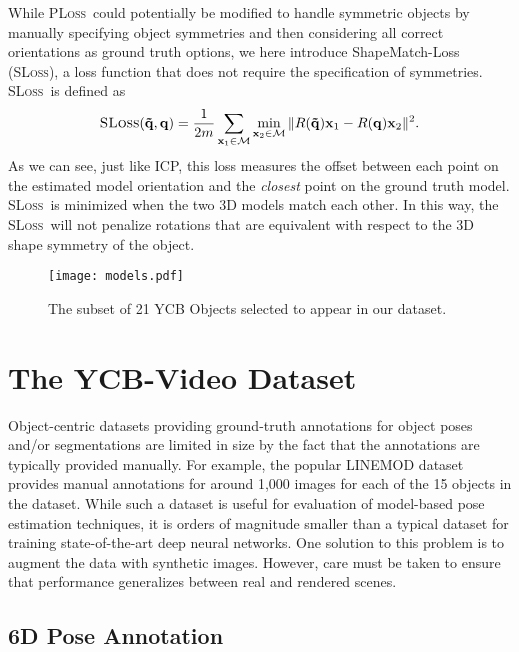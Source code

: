 \documentclass[conference]{IEEEtran}
\newcommand{\sloss}{\textsc{SLoss}}
\newcommand{\pl}{\textsc{PLoss}}
\begin{document}
While \pl\ could potentially be modified to handle symmetric objects by manually specifying object symmetries and then considering all correct orientations as ground truth options, we here introduce ShapeMatch-Loss (\sloss), a loss function that does not require the specification of symmetries. \sloss\ is defined as
\begin{equation}
\text{\sloss}(\mathbf{\tilde{q}}, \mathbf{q}) = \frac{1}{2m}\sum_{\mathbf{x}_1 \in \mathcal{M}} \min_{\mathbf{x}_2 \in \mathcal{M}} \| R(\mathbf{\tilde{q}}) \mathbf{x}_1 - R(\mathbf{q}) \mathbf{x}_2  \|^2.
\end{equation}
As we can see, just like ICP, this loss measures the offset between each point on the estimated model orientation and the \emph{closest} point on the ground truth model. \sloss\ is minimized when the two 3D models match each other. In this way, the \sloss\ will not penalize rotations that are equivalent with respect to the 3D shape symmetry of the object.










\begin{figure}
	\centering
	\texttt{[image: models.pdf]}
	\caption{The subset of 21 YCB Objects selected to appear in our dataset.}
	\label{fig:ycb}
	\vspace{-2mm}
\end{figure}

\section{The YCB-Video Dataset}

Object-centric datasets providing ground-truth annotations for object poses and/or segmentations are limited in size by the fact that the annotations are typically provided manually. For example, the popular LINEMOD dataset \cite{hinterstoisser2012model} provides manual annotations for around 1,000 images for each of the 15 objects in the dataset. While such a dataset is useful for evaluation of model-based pose estimation techniques, it is orders of magnitude smaller than a typical dataset for training state-of-the-art deep neural networks. One solution to this problem is to augment the data with synthetic images. However, care must be taken to ensure that performance generalizes between real and rendered scenes.

\subsection{6D Pose Annotation}
\end{document}
